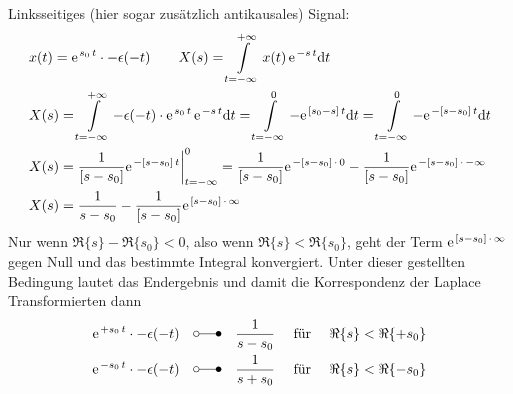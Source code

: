 \documentclass[11pt,a4paper,DIV=12]{scrartcl}
\numberwithin{equation}{section}
\numberwithin{figure}{section}
\newcommand\fsd{\mathrm{d}} %
\begin{document}
\begin{ExCalc}
Linksseitiges (hier sogar zusätzlich antikausales) Signal:
\begin{align}
&x(t) = \e^{s_0 \, t} \cdot - \epsilon(-t) \qquad
X(s) = \int\limits_{t = -\infty}^{+\infty} x(t) \, \e^{-s\,t}  \fsd t\\
&X(s) = \int\limits_{t = -\infty}^{+\infty} -\epsilon(-t) \cdot \e^{s_0 \, t} \, \e^{-s\,t}  \fsd t
= \int\limits_{t = -\infty}^{0} -\e^{[s_0-s]\,t} \fsd t = \int\limits_{t = -\infty}^{0} -\e^{-[s-s_0]\,t} \fsd t\\
&X(s) = \frac{1}{[s-s_0]}\e^{-[s-s_0]\,t}\bigg|_{t=-\infty}^{0}=
\frac{1}{[s-s_0]}\e^{-[s-s_0]\,\cdot\, 0} - \frac{1}{[s-s_0]}\e^{-[s-s_0]\,\cdot\, -\infty}\\
&X(s) = \frac{1}{s-s_0} - \frac{1}{[s-s_0]}\e^{[s-s_0]\,\cdot\, \infty}
\end{align}
Nur wenn $\Re\{s\}-\Re\{s_0\} < 0$, also wenn $\Re\{s\}<\Re\{s_0\}$, geht
der Term $\e^{[s-s_0]\,\cdot\,\infty }$ gegen Null und das bestimmte Integral
konvergiert.
Unter dieser gestellten Bedingung lautet das Endergebnis und damit die
Korrespondenz der Laplace Transformierten dann
\begin{align}
\e^{+s_0 \, t} \cdot -\epsilon(-t) \quad \laplace \quad \frac{1}{s-s_0} \quad\text{ für } \quad\Re\{s\} < \Re\{+s_0\}\\
\e^{-s_0 \, t} \cdot -\epsilon(-t) \quad \laplace \quad \frac{1}{s+s_0} \quad\text{ für } \quad\Re\{s\} < \Re\{-s_0\}
\end{align}
\end{ExCalc}
\end{document}

